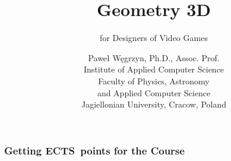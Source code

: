 \documentclass[10pt,t]{beamer}
\title{Geometry 3D}
\subtitle{for Designers of Video Games}
\author{Paweł Węgrzyn, Ph.D., Assoc. Prof. \\[1em]
  Institute of Applied Computer Science \\
  Faculty of Physics, Astronomy \\
  and Applied Computer Science \\
  Jagiellonian University, Cracow, Poland}
\date{}
\begin{document}





\RaggedRight





\maketitle





















\begin{frame}
  \frametitle{Getting ECTS~points for the Course}




\end{frame}














\end{document}

